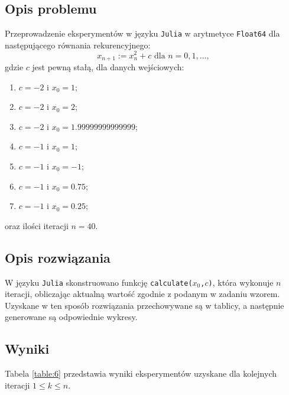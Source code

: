 \documentclass{classrep}
\begin{document}
	\subsection{Opis problemu}
		Przeprowadzenie eksperymentów w języku \texttt{Julia} w arytmetyce \texttt{Float64} dla następującego równania rekurencyjnego:
		$$x_{n+1} := x^{2}_{n} + c \text{ dla } n = 0, 1, \dots,$$
		gdzie $c$ jest pewną stałą, dla danych wejściowych:
		\begin{enumerate}
			\item $c = -2$ i $x_0 = 1$;
			\item $c = -2$ i $x_0 = 2$;
			\item $c = -2$ i $x_0 = 1.99999999999999$;
			\item $c = -1$ i $x_0 = 1$;
			\item $c = -1$ i $x_0 = -1$;
			\item $c = -1$ i $x_0 = 0.75$;
			\item $c = -1$ i $x_0 = 0.25$;
		\end{enumerate}
		oraz ilości iteracji $n = 40$.
	\subsection{Opis rozwiązania}
		W języku \texttt{Julia} skonstruowano funkcję \texttt{calculate($x_0$,$c$)}, która wykonuje $n$ iteracji, obliczając aktualną wartość zgodnie z podanym w zadaniu wzorem. Uzyskane w ten sposób rozwiązania przechowywane są w tablicy, a następnie generowane są odpowiednie wykresy.
		
	\subsection{Wyniki}
		Tabela \ref{table:6} przedstawia wyniki eksperymentów uzyskane dla kolejnych iteracji $1 \le k \le n$.	
	
\end{document}
